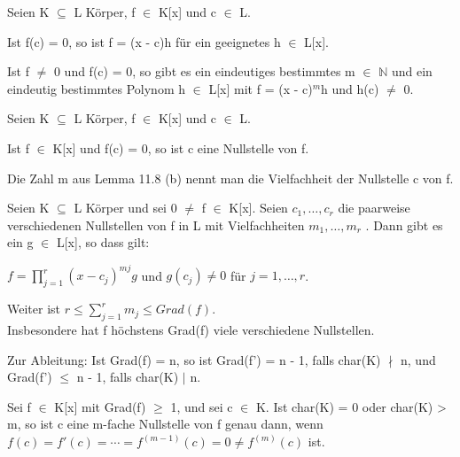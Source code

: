 \begin{lemma}
Seien K $\subseteq$ L Körper, f $\in$ K[x] und c $\in$ L.
\begin{compactenum}
\item Ist f(c) = 0, so ist f = (x - c)h für ein geeignetes h $\in$ L[x].
\item Ist f $\neq$ 0 und f(c) = 0, so gibt es ein eindeutiges bestimmtes m $\in$ $\mathbb{N}$ und ein eindeutig bestimmtes Polynom h $\in$ L[x] mit f = (x - c)$^m$h und h(c) $\neq$ 0.
\end{compactenum}
\end{lemma}

\begin{definition}
Seien K $\subseteq$ L Körper, f $\in$ K[x] und c $\in$ L.
\begin{compactenum}
\item Ist f $\in$ K[x] und f(c) = 0, so ist c eine Nullstelle von f.
\item Die Zahl m aus Lemma 11.8 (b) nennt man die Vielfachheit der Nullstelle c von f.
\end{compactenum}
\end{definition}

\begin{lemma}
Seien K $\subseteq$ L Körper und sei 0 $\neq$ f $\in$ K[x]. Seien $c_1, …, c_r$ die paarweise verschiedenen Nullstellen von f in L mit Vielfachheiten $m_1 , …, m_r$ . Dann gibt es ein g $\in$ L[x], so dass gilt:
\begin{center}
$f = \prod\limits_{j=1}^{r} (x - c_j)^{mj} g$ und $g(c_j) \neq 0$ für $j = 1, …, r$.
\end{center}
Weiter ist $r \le \sum\nolimits_{j=1}^{r}m_j \le Grad(f)$.\\
Insbesondere hat f höchstens Grad(f) viele verschiedene Nullstellen.
\end{lemma}

Zur Ableitung: Ist Grad(f) = n, so ist Grad(f') = n - 1, falls char(K) $\nmid$ n, und Grad(f') $\le$ n - 1, falls char(K) $\mid$ n.

\begin{lemma}
Sei f $\in$ K[x] mit Grad(f) $\ge$ 1, und sei c $\in$ K. Ist char(K) = 0 oder char(K) > m, so ist c eine m-fache Nullstelle von f genau dann, wenn $f(c) = f'(c) = \cdots = f^{(m-1)}(c) = 0 \neq f^{(m)}(c)$ ist.
\end{lemma}

